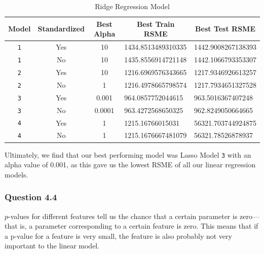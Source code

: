 \documentclass[11pt,letterpaper]{article}
\begin{document}
\begin{table}[H]
    \centering
    \begin{tabular}{cccll}
        \hline
    Model & Standardized &Best Alpha & \multicolumn{1}{c}{Best Train RSME} & \multicolumn{1}{c}{Best Test RSME} \\
    \hline
    \texttt{1}   & Yes      & 10       & 1434.8513489310335                                                   &  1442.9008267138393                                                    \\
    \texttt{1}   & No        & 10       & 1435.8556914721148                                                  & 1442.1066793353307                                                  \\
    \texttt{2}   & Yes        & 10      & 1216.6969576343665                                                   & 1217.9346926613257                                                     \\
    \texttt{2}   & No        & 1      & 1216.4978665798574                                               & 1217.7934651327528                                                   \\
    \texttt{3}   & Yes        & 0.001       & 964.0857752044615                                                    &  963.5016367407248                                                    \\
    \texttt{3}   & No       & 0.0001       & 963.4272568650325                                                   &962.8249050664665                                                     \\
    \texttt{4}   & Yes        & 1       & 1215.16766015031                                                   & 56321.703744924875                                                     \\
    \texttt{4}   & No       & 1       & 1215.1676667481079                                                  & 56321.78526878937                                                    
    \end{tabular}
    \caption{Ridge Regression Model}
\end{table}

Ultimately, we find that our best performing model was Lasso Model \texttt{3} with an alpha value of 
0.001, as this gave us the lowest RSME of all our linear regression models.


\subsubsection*{Question 4.4}
$p$-values for different features tell us the chance that a certain parameter is zero—
that is, a parameter corresponding to a certain feature is zero. This means that if a
p-value for a feature is very small, the feature is also probably not very important to
the linear model. 
\end{document}
